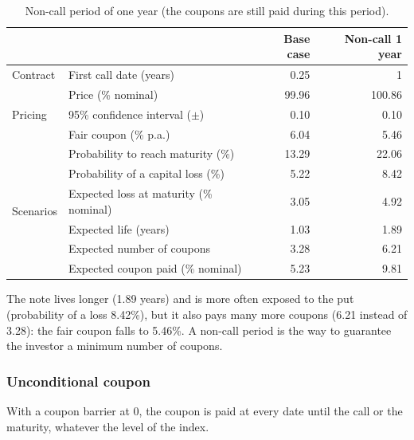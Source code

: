 \documentclass[11pt,a4paper]{article}
\begin{document}
\begin{table}[htbp]
  \centering
  \small
  \begin{tabular}{llrr}
    \toprule
     & & \textbf{Base case} & \textbf{Non-call 1 year} \\
    \midrule
    \multirow{1}{*}{Contract}
      & First call date (years) & 0.25 & 1 \\
    \midrule
    \multirow{3}{*}{Pricing}
      & Price (\% nominal) & 99.96 & 100.86 \\
      & 95\% confidence interval ($\pm$) & 0.10 & 0.10 \\
      & Fair coupon (\% p.a.) & 6.04 & 5.46 \\
    \midrule
    \multirow{6}{*}{Scenarios}
      & Probability to reach maturity (\%) & 13.29 & 22.06 \\
      & Probability of a capital loss (\%) & 5.22 & 8.42 \\
      & Expected loss at maturity (\% nominal) & 3.05 & 4.92 \\
      & Expected life (years) & 1.03 & 1.89 \\
      & Expected number of coupons & 3.28 & 6.21 \\
      & Expected coupon paid (\% nominal) & 5.23 & 9.81 \\
    \bottomrule
  \end{tabular}
  \caption{Non-call period of one year (the coupons are still paid during this period).}
  \label{tab:phoenix-noncall}
\end{table}

The note lives longer (1.89 years) and is more often exposed to the put (probability of a loss 8.42\%), but it also
pays many more coupons (6.21 instead of 3.28): the fair coupon falls to 5.46\%. A non-call period is the way to
guarantee the investor a minimum number of coupons.

\clearpage
\subsubsection{Unconditional coupon}

With a coupon barrier at 0, the coupon is paid at every date until the call or the maturity, whatever the level of the
index.
\end{document}
